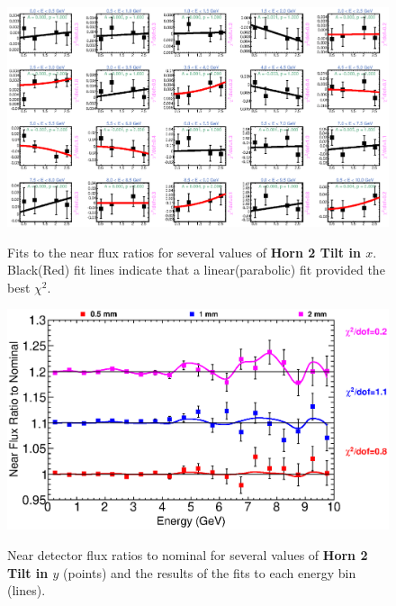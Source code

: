 {\begin{figure}[ht]
  \begin{center}
    {\includegraphics[width=5.0in]{figures/Horn2XTilt_near_fits.eps}}
  \end{center}
\caption{ Fits to the near flux ratios for several values of {\bf Horn 2 Tilt in $x$}. Black(Red) fit lines indicate that a linear(parabolic) fit provided the best $\chi^2$. }
\end{figure}

\begin{figure}[ht]
  \begin{center}
    {\includegraphics[width=6.0in]{figures/Horn2YTilt_near_summary.eps}}
  \end{center}
\caption{ Near detector flux ratios to nominal for several values of {\bf Horn 2 Tilt in $y$} (points) and the results of the fits to each energy bin (lines).}
\end{figure}

}
